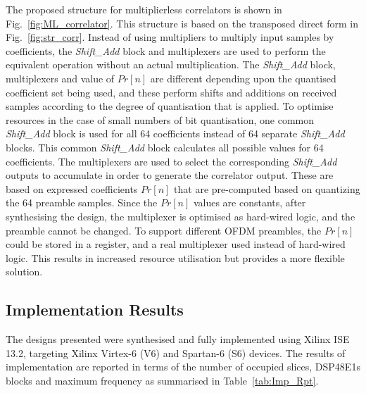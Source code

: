 The proposed structure for multiplierless correlators is shown in Fig.~\ref{fig:ML_correlator}.
This structure is based on the transposed direct form in Fig.~\ref{fig:str_corr}.
Instead of using multipliers to multiply input samples by coefficients, the \emph{Shift\_Add} block and multiplexers are used to perform the equivalent operation without an actual multiplication.
The \emph{Shift\_Add} block, multiplexers and value of $Pr[n]$ are different depending upon the quantised coefficient set being used, and these perform shifts and additions on received samples according to the degree of quantisation that is applied.
To optimise resources in the case of small numbers of bit quantisation, one common \emph{Shift\_Add} block is used for all 64 coefficients instead of 64 separate \emph{Shift\_Add} blocks.
This common \emph{Shift\_Add} block calculates all possible values for 64 coefficients.
The multiplexers are used to select the corresponding \emph{Shift\_Add} outputs to accumulate in order to generate the correlator output.
These are based on expressed coefficients $Pr[n]$ that are pre-computed based on quantizing the 64 preamble samples.
Since the $Pr[n]$ values are constants, after synthesising the design, the multiplexer is optimised as hard-wired logic, and the preamble cannot be changed.
To support different OFDM preambles, the $Pr[n]$ could be stored in a register, and a real multiplexer used instead of hard-wired logic.
This results in increased resource utilisation but provides a more flexible solution.

\subsection{Implementation Results}

The designs presented were synthesised and fully implemented using Xilinx ISE 13.2, targeting Xilinx Virtex-6 (V6) and Spartan-6 (S6) devices.
The results of implementation are reported in terms of the number of occupied slices, DSP48E1s blocks and maximum frequency as summarised in Table~\ref{tab:Imp_Rpt}.

